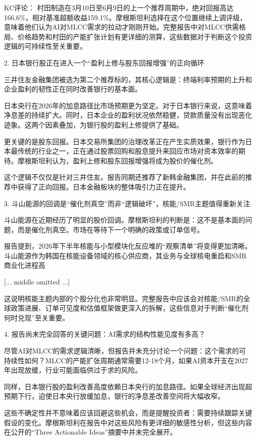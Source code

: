 \documentclass[11pt]{ctexart}
\begin{document}
KC评论： 村田制造在3月10日至6月9日的上一个推荐周期中，绝对回报高达166.6\%，相对基准超额收益159.1\%。摩根斯坦利选择在这个位置继续上调评级，意味着他们认为AI对MLCC需求的拉动才刚刚开始。完整报告中对MLCC供需格局、价格趋势和村田的产能扩张计划有更详细的测算，这些数据对于判断这个投资逻辑的可持续性至关重要。

2. 日本银行股正在进入一个“盈利上修与股东回报增强”的正向循环

三井住友金融集团被选为第二个推荐标的，其核心逻辑是：终端利率预期的上升和企业盈利的韧性正在同时改善银行的基本面。

日本央行在2026年的加息路径比市场预期更为坚定。对于日本银行来说，这意味着净息差的持续扩大。同时，日本企业的盈利状况依然稳健，贷款质量没有出现恶化迹象。这两个因素叠加，为银行股的盈利上修提供了基础。

更关键的是股东回报。日本交易所集团的治理改革正在产生实质效果，银行作为日本最传统的行业之一，正在通过股票回购和股息提升来回应市场对资本效率的期待。摩根斯坦利认为，盈利上修和股东回报增强将成为股价的催化剂。

这个逻辑不仅仅是针对三井住友。报告同期还推荐了新韩金融集团，并在此前的推荐中获得了正向回报。日本金融板块的整体吸引力正在提升。

3. 斗山能源的回调是“催化剂真空”而非“逻辑破坏”，核能/SMR主题值得重新关注

斗山能源在近期经历了明显的股价回调。摩根斯坦利的判断是：这不是基本面的问题，而是催化剂真空。市场在等待下一个明确的政策或订单信号。

报告提到，2026年下半年核能与小型模块化反应堆的“观察清单”将变得更加清晰。斗山能源作为韩国在核能设备领域的核心供应商，其业务与全球核电重启和SMR商业化进程高

[... middle omitted ...]

这说明核能主题内部的个股分化也非常明显。完整报告中应该会对核能/SMR的全球政策进展、订单可见度和估值框架做更深入的拆解，这些信息对于判断“催化剂何时兑现”至关重要。

4. 报告尚未完全回答的关键问题：AI需求的结构性能见度有多高？

尽管AI对MLCC的需求逻辑清晰，但报告并未充分讨论一个问题：这个需求的可持续性如何？MLCC的产能扩张周期通常需要12-18个月，如果AI资本开支在2027年出现放缓，行业可能面临供过于求的风险。

同样，日本银行股的盈利改善高度依赖日本央行的加息路径。如果全球经济出现超预期下行，迫使日本央行放缓加息，银行的净息差改善空间将大幅收窄。

这些不确定性并不意味着应该回避这些机会，而是提醒投资者：需要持续跟踪关键假设的变化。摩根斯坦利在报告中对这些风险有更详细的敏感性分析，但这些内容在公开的“Three Actionable Ideas”摘要中并未完全展开。
\end{document}
